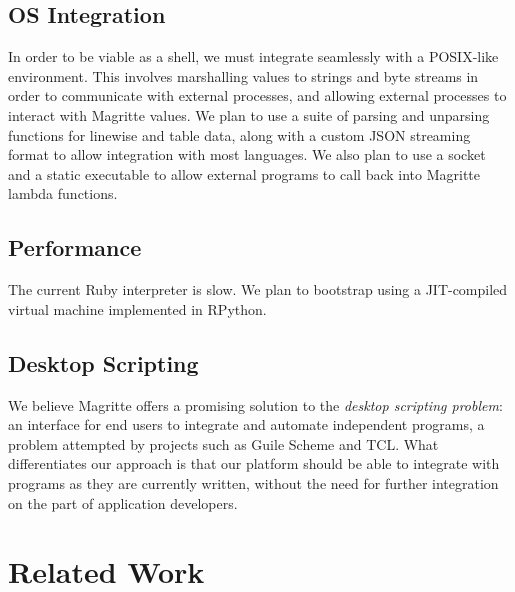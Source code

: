 \ifsigpro{ \documentclass[english,PRO]{ipsj} }
\begin{document}
\subsection{OS Integration}\noindent
In order to be viable as a shell, we must integrate seamlessly with a POSIX-like environment. This involves marshalling values to strings and byte streams in order to communicate with external processes, and allowing external processes to interact with Magritte values. We plan to use a suite of parsing and unparsing functions for linewise and table data, along with a custom JSON streaming format to allow integration with most languages. We also plan to use a socket and a static executable to allow external programs to call back into Magritte lambda functions.


\subsection{Performance}\noindent
The current Ruby interpreter is slow. We plan to bootstrap using a JIT-compiled virtual machine implemented in RPython.

\subsection{Desktop Scripting}\noindent
We believe Magritte offers a promising solution to the \emph{desktop scripting problem}: an interface for end users to integrate and automate independent programs, a problem attempted by projects such as Guile Scheme\cite{guile} and TCL\cite{tcl}.
What differentiates our approach is that our platform should be able to integrate with programs as they are currently written, without the need for further integration on the part of application developers.

\section{Related Work}\label{related-work}
\end{document}
